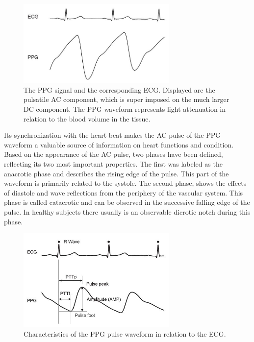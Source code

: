 \begin{figure}[ht]
	\centering
  \includegraphics[width=0.7\textwidth, angle=0]{images/ppg_raw.jpg}
	\caption[PPG signal]{The PPG signal and the corresponding ECG. Displayed are the pulsatile AC component, which is super imposed on the much larger DC component. The PPG waveform represents light attenuation in relation to the blood volume in the tissue.}
	\label{ppg_pw}
\end{figure}

Its synchronization with the heart beat makes the AC pulse of the PPG waveform a valuable source of information on heart functions and condition. Based on the appearance of the AC pulse, two phases have been defined, reflecting its two most important properties. The first was labeled as the anacrotic phase and describes the rising edge of the pulse. This part of the waveform is primarily related to the systole. The second phase, shows the effects of diastole and wave reflections from the periphery of the vascular system. This phase is called catacrotic and can be observed in the successive falling edge of the pulse. In healthy subjects there usually is an observable dicrotic notch during this phase.
\begin{figure}[ht]
	\centering
  \includegraphics[width=0.7\textwidth, angle=0]{images/ppg_pw.jpg}
	\caption[PPG pulse characteristics]{Characteristics of the PPG pulse waveform in relation to the ECG.}
	\label{ppg_pw}
\end{figure}


